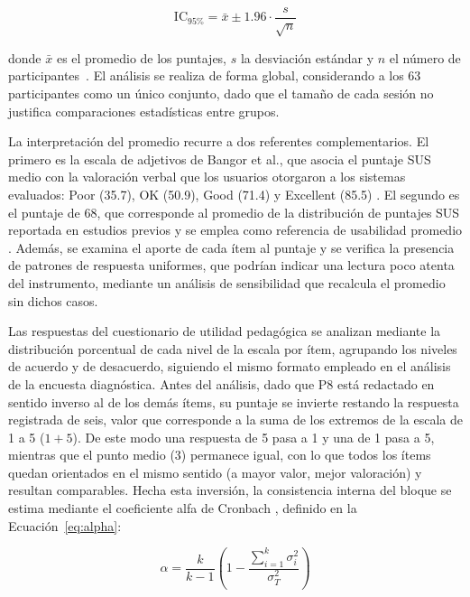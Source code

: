 \begin{equation}
  \mathrm{IC}_{95\%} = \bar{x} \pm 1.96 \cdot \frac{s}{\sqrt{n}}
  \label{eq:ci}
\end{equation}

donde $\bar{x}$ es el promedio de los puntajes, $s$ la desviación estándar y $n$ el número de participantes~\cite{sauro2016quantifying}. El análisis se realiza de forma global, considerando a los 63 participantes como un único conjunto, dado que el tamaño de cada sesión no justifica comparaciones estadísticas entre grupos.

La interpretación del promedio recurre a dos referentes complementarios. El primero es la escala de adjetivos de Bangor et al., que asocia el puntaje SUS medio con la valoración verbal que los usuarios otorgaron a los sistemas evaluados: Poor (35.7), OK (50.9), Good (71.4) y Excellent (85.5) \cite{bangor2009determining}. El segundo es el puntaje de 68, que corresponde al promedio de la distribución de puntajes SUS reportada en estudios previos y se emplea como referencia de usabilidad promedio \cite{sauro2016quantifying}. Además, se examina el aporte de cada ítem al puntaje y se verifica la presencia de patrones de respuesta uniformes, que podrían indicar una lectura poco atenta del instrumento, mediante un análisis de sensibilidad que recalcula el promedio sin dichos casos.

Las respuestas del cuestionario de utilidad pedagógica se analizan mediante la distribución porcentual de cada nivel de la escala por ítem, agrupando los niveles de acuerdo y de desacuerdo, siguiendo el mismo formato empleado en el análisis de la encuesta diagnóstica. Antes del análisis, dado que P8 está redactado en sentido inverso al de los demás ítems, su puntaje se invierte restando la respuesta registrada de seis, valor que corresponde a la suma de los extremos de la escala de 1 a 5 ($1 + 5$). De este modo una respuesta de 5 pasa a 1 y una de 1 pasa a 5, mientras que el punto medio (3) permanece igual, con lo que todos los ítems quedan orientados en el mismo sentido (a mayor valor, mejor valoración) y resultan comparables. Hecha esta inversión, la consistencia interna del bloque se estima mediante el coeficiente alfa de Cronbach \cite{cronbach1951coefficient}, definido en la Ecuación~\ref{eq:alpha}:

\begin{equation}
  \alpha = \frac{k}{k-1} \left( 1 - \frac{\sum_{i=1}^{k} \sigma_i^2}{\sigma_T^2} \right)
  \label{eq:alpha}
\end{equation}

